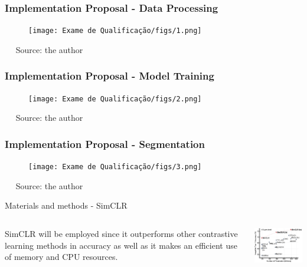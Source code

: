 \documentclass[xcolor=table]{beamer}
\begin{document}
\begin{frame}\frametitle{Implementation Proposal - Data Processing} 

	\begin{figure}[htb]
		\centering
		\texttt{[image: Exame de Qualificação/figs/1.png]}
		\label{fig:data}
	\end{figure}
	~\flushright \tiny~ {Source: the author}
\end{frame}

\begin{frame}\frametitle{Implementation Proposal - Model Training} 

	\begin{figure}[htb]
		\centering
		\texttt{[image: Exame de Qualificação/figs/2.png]}
		\label{fig:model}
	\end{figure}
	~\flushright \tiny~ {Source: the author}
\end{frame}

\begin{frame}\frametitle{Implementation Proposal - Segmentation} 

	\begin{figure}[htb]
		\centering
		\texttt{[image: Exame de Qualificação/figs/3.png]}
		\label{fig:segmentation}
	\end{figure}
	~\flushright \tiny~ {Source: the author}
\end{frame}

\begin{frame}{Materials and methods - SimCLR}
    
    \begin{columns}
        \centering
            \begin{tcolorbox}[width=6cm,colback=yellow!5,colframe=yellow!75!black]
            SimCLR will be employed since it outperforms other contrastive learning methods in accuracy as well as it makes an efficient use of memory and CPU resources.
            \end{tcolorbox}
            \centering
            \includegraphics[width=5cm]{figs/simclr_chart_original.png}
            \tiny~\cite{chen2020}
    \end{columns}
\end{frame}
\end{document}
